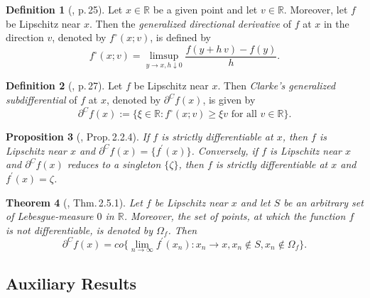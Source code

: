 \documentclass[reqno, 11pt]{amsart}%
\newcommand{\R}{\mathbb{R}}
\newtheorem{theorem}{Theorem}
\newtheorem{proposition}[theorem]{Proposition}
\theoremstyle{definition}
\newtheorem{definition}[theorem]{Definition}
\numberwithin{equation}{section} \numberwithin{theorem}{section}
\begin{document}
\begin{definition}[\cite{Clarke1983}, p.\,25]\label{def:gendirder}
   Let $x\in\R$ be a given point and let $v\in\R$. Moreover, let $f$ be Lipschitz near $x$. Then the \emph{generalized directional derivative} of $f$ at $x$ in the direction $v$, denoted by $f^\circ(x;v)$, is defined by
   \begin{equation*}
   f^\circ(x;v) = \limsup_{y\to x, h\downarrow 0}\frac{f(y+h\,v)-f(y)}{h}.
   \end{equation*}
\end{definition}

\begin{definition}[\cite{Clarke1983}, p.\,27]\label{def:Clarksub}
   Let $f$ be Lipschitz near $x$. Then \emph{Clarke's generalized subdifferential} of $f$ at $x$, denoted by $\partial^C f(x)$, is given by
   \begin{equation*}
   \partial^Cf(x):=\big\{\xi\in\R: f^\circ(x;v)\ge \xi v \text{ for all }v\in\R\big\}.
   \end{equation*}
\end{definition}

\begin{proposition}[\cite{Clarke1983}, Prop.\,2.2.4]\label{pr:propClarkediff}
   If $f$ is strictly differentiable at $x$, then $f$ is Lipschitz near $x$ and $\partial^C f(x) = \{f^\prime(x)\}$. Conversely, if $f$ is Lipschitz near $x$ and $\partial^C f(x)$ reduces to a singleton $\{\zeta\}$, then $f$ is strictly differentiable at $x$ and $f^\prime(x)=\zeta$.
\end{proposition}

\begin{theorem}[\cite{Clarke1983}, Thm.\,2.5.1]\label{th:genCgco}
   Let $f$ be Lipschitz near $x$ and let $S$ be an arbitrary set of Lebesgue-measure $0$ in $\R$. Moreover, the set of points, at which the function $f$ is not differentiable, is denoted by $\Omega_f$.
   Then
   \begin{equation*}
   \partial^C f(x) = co\Big\{\lim_{n\to\infty} f^\prime(x_n): x_n\to x, x_n\notin S, x_n\notin\Omega_f\Big\}.
   \end{equation*}
\end{theorem}


\subsection{Auxiliary Results}
\end{document}
